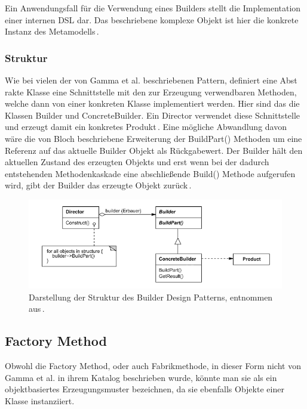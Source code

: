 \documentclass[12pt,oneside,a4paper,parskip]{scrbook}
\begin{document}
Ein Anwendungsfall für die Verwendung eines Builders stellt die Implementation einer internen DSL dar. Das beschriebene komplexe Objekt ist hier die konkrete Instanz des Metamodells\,\cite[S. 343ff.]{fowler2010}.

\subsubsection{Struktur}

Wie bei vielen der von Gamma et al. beschriebenen Pattern, definiert eine Abst rakte Klasse eine Schnittstelle mit den zur Erzeugung verwendbaren Methoden, welche dann von einer konkreten Klasse implementiert werden. Hier sind das die Klassen Builder und ConcreteBuilder. Ein Director verwendet diese Schnittstelle und erzeugt damit ein konkretes Produkt\,\cite[S. 162f.]{gamma2015}. Eine mögliche Abwandlung davon wäre die von Bloch beschriebene Erweiterung der BuildPart() Methoden um eine Referenz auf das aktuelle Builder Objekt als Rückgabewert. Der Builder hält den aktuellen Zustand des erzeugten Objekts und erst wenn bei der dadurch entstehenden Methodenkaskade eine abschließende Build() Methode aufgerufen wird, gibt der Builder das erzeugte Objekt zurück\,\cite[S. 13ff]{bloch2017}.

\begin{figure}[htbp]
	\centering
	\includegraphics[width=1.0\textwidth]{bilder/builder}
	\caption{Darstellung der Struktur des Builder Design Patterns, entnommen aus\,\cite[S. 162]{gamma2015}.}
	\label{fig:builder}
\end{figure}

\subsection{Factory Method}

Obwohl die Factory Method, oder auch Fabrikmethode, in dieser Form nicht von Gamma et al. in ihrem Katalog beschrieben wurde, könnte man sie als ein objektbasiertes Erzeugungsmuster bezeichnen, da sie ebenfalls Objekte einer Klasse instanziiert.
\end{document}
